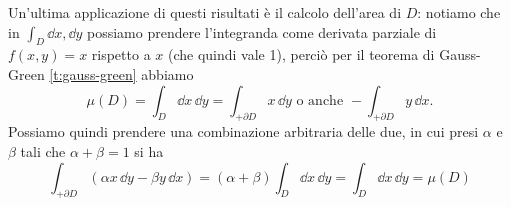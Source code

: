 Un'ultima applicazione di questi risultati è il calcolo dell'area di $D$: notiamo che in $\int_D\dd x,\dd y$ possiamo prendere l'integranda come derivata parziale di $f(x,y)=x$ rispetto a $x$ (che quindi vale 1), perciò per il teorema di Gauss-Green \ref{t:gauss-green} abbiamo
\begin{equation}
	\mu(D)=\int_D\dd x\,\dd y=\int_{+\partial D}x\,\dd y\text{ o anche }-\int_{+\partial D}y\,\dd x.
\end{equation}
Possiamo quindi prendere una combinazione arbitraria delle due, in cui presi $\alpha$ e $\beta$ tali che $\alpha+\beta=1$ si ha
\begin{equation}
	\int_{+\partial D}(\alpha x\,\dd y-\beta y\,\dd x)=(\alpha+\beta)\int_D\dd x\,\dd y=\int_D\dd x\,\dd y=\mu(D)
\end{equation}

